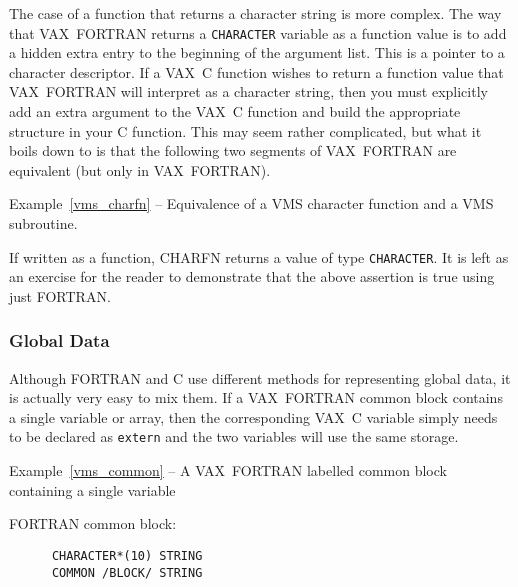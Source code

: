 \documentclass[twoside,11pt]{article}
\newcommand{\latex}[1]{#1}
\renewcommand{\_}{\texttt{\symbol{95}}}
\newcounter{examples}
\begin{document}
The case of a function that returns a character string is more complex. The way
that VAX~FORTRAN returns a \texttt{CHARACTER} variable as a function value is 
to add a hidden extra entry to the beginning of the argument list. 
This is a pointer to
a character descriptor. If a VAX~C function wishes to return a function value
that VAX~FORTRAN will interpret as a character string, then you must explicitly
add an extra argument to the VAX~C function and build the appropriate structure
in your C function. This may seem rather complicated, but what it boils down to
is that the following two segments of VAX~FORTRAN are equivalent (but only in
VAX~FORTRAN).

\pagebreak[3]
\label{vms_charfn}
\begin{center}
Example\latex{~\ref{vms_charfn}}
-- Equivalence of a VMS character function and a
VMS subroutine.
\end{center}
If written as a function, CHARFN returns a value of type \texttt{CHARACTER}\@. 
It is left as an exercise for the reader to demonstrate that the above 
assertion is true using just FORTRAN\@.

\subsubsection{Global Data}

Although FORTRAN and C use different methods for representing global data, it is
actually very easy to mix them. If a VAX~FORTRAN common block contains a single
variable or array, then the corresponding VAX~C variable simply needs to be
declared as \texttt{extern} and the two variables will use the same storage. 

\label{vms_common}
\begin{center}
Example\latex{~\ref{vms_common}}
-- A VAX~FORTRAN labelled common block containing a single variable
\end{center}
\nopagebreak[4]
FORTRAN common block:
{\small \begin{verbatim}
      CHARACTER*(10) STRING
      COMMON /BLOCK/ STRING
\end{verbatim} }
\end{document}
